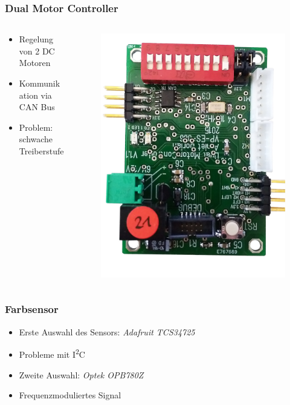 \begin{frame}
	\frametitle{Dual Motor Controller}
	
	\begin{columns}[T]
		\begin{column}{0.45\textwidth}
			\begin{center}
				\begin{itemize}
					\item Regelung von 2 DC Motoren
					\item Kommunikation via CAN Bus
					\item Problem: schwache Treiberstufe
				\end{itemize}
			\end{center}
		\end{column}
		\begin{column}{0.45\textwidth}
			\begin{figure}
				\includegraphics[width=0.7\columnwidth]{../images/presentation/DMC.jpg}
			\end{figure}
		\end{column}
	\end{columns}
	
\end{frame}

\begin{frame}
	\frametitle{Farbsensor}
	
	\begin{itemize}
		\item Erste Auswahl des Sensors: \textit{Adafruit TCS34725}
		\item Probleme mit I\textsuperscript{2}C
		\item Zweite Auswahl: \textit{Optek OPB780Z}
		\item Frequenzmoduliertes Signal
	\end{itemize}
	
\end{frame}
